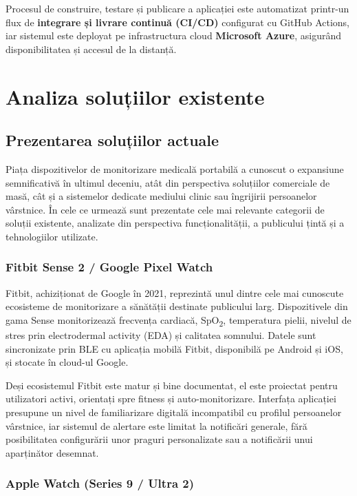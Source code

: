 \documentclass[12pt,a4paper]{article}
\newcommand{\spo}{SpO\textsubscript{2}}
\begin{document}
Procesul de construire, testare și publicare a aplicației este automatizat printr-un flux de \textbf{integrare și livrare continuă (CI/CD)} configurat cu GitHub Actions, iar sistemul este deployat pe infrastructura cloud \textbf{Microsoft Azure}, asigurând disponibilitatea și accesul de la distanță.

\newpage
\section{Analiza soluțiilor existente}

\subsection{Prezentarea soluțiilor actuale}

Piața dispozitivelor de monitorizare medicală portabilă a cunoscut o expansiune semnificativă în ultimul deceniu, atât din perspectiva soluțiilor comerciale de masă, cât și a sistemelor dedicate mediului clinic sau îngrijirii persoanelor vârstnice. În cele ce urmează sunt prezentate cele mai relevante categorii de soluții existente, analizate din perspectiva funcționalității, a publicului țintă și a tehnologiilor utilizate.

\subsubsection{Fitbit Sense 2 / Google Pixel Watch}

Fitbit, achiziționat de Google în 2021, reprezintă unul dintre cele mai cunoscute ecosisteme de monitorizare a sănătății destinate publicului larg. Dispozitivele din gama Sense monitorizează frecvența cardiacă, \spo, temperatura pielii, nivelul de stres prin electrodermal activity (EDA) și calitatea somnului. Datele sunt sincronizate prin BLE cu aplicația mobilă Fitbit, disponibilă pe Android și iOS, și stocate în cloud-ul Google.

Deși ecosistemul Fitbit este matur și bine documentat, el este proiectat pentru utilizatori activi, orientați spre fitness și auto-monitorizare. Interfața aplicației presupune un nivel de familiarizare digitală incompatibil cu profilul persoanelor vârstnice, iar sistemul de alertare este limitat la notificări generale, fără posibilitatea configurării unor praguri personalizate sau a notificării unui aparținător desemnat.

\subsubsection{Apple Watch (Series 9 / Ultra 2)}
\end{document}
